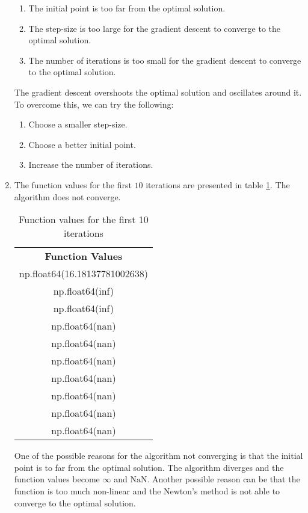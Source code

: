 \documentclass[12pt,a4paper]{article}
\theoremstyle{remark}
\begin{document}
\begin{enumerate}
    \begin{enumerate}
        \item The initial point is too far from the optimal solution.
        \item The step-size is too large for the gradient descent to converge to the optimal solution.
        \item The number of iterations is too small for the gradient descent to converge to the optimal solution.
    \end{enumerate}

    The gradient descent overshoots the optimal solution and oscillates around it. To overcome this, we can try the following:

    \begin{enumerate}
        \item Choose a smaller step-size.
        \item Choose a better initial point.
        \item Increase the number of iterations.
    \end{enumerate}

    \item The function values for the first $10$ iterations are presented in table \ref{table:f3_first_10_iterations}. The algorithm does not converge.
    
    \begin{table}
        \centering
        \begin{tabular}{|c|}
        \hline
        \textbf{Function Values} \\
        np.float64(16.18137781002638)\\
        np.float64(inf)\\
        np.float64(inf)\\
        np.float64(nan)\\
        np.float64(nan)\\
        np.float64(nan)\\
        np.float64(nan)\\
        np.float64(nan)\\
        np.float64(nan)\\
        np.float64(nan) \\
        \hline
        \end{tabular}
        \caption{Function values for the first 10 iterations}
        \label{table:f3_first_10_iterations}
    \end{table}

    One of the possible reasons for the algorithm not converging is that the initial point is to far from the optimal solution. The algorithm diverges and the function values become $\infty$ and $\text{NaN}$. Another possible reason can be that the function is too much non-linear and the Newton's method is not able to converge to the optimal solution.


\end{enumerate}
\end{document}
